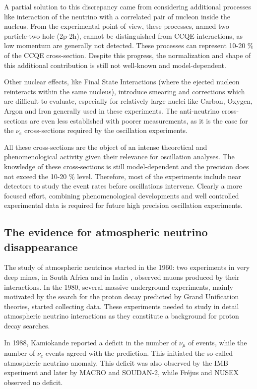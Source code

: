 A partial solution to this discrepancy came from considering additional processes like interaction of the neutrino with a correlated pair of nucleon inside the nucleus. From the experimental point of view, these processes, named two particle-two hole (2p-2h), cannot be distinguished from CCQE interactions, as low momentum are generally not detected. These processes can represent 10-20 \% of the CCQE cross-section. Despite this progress, the normalization and shape of this additional contribution is still not well-known and model-dependent.

Other nuclear effects, like Final State Interactions (where the ejected nucleon reinteracts within the same nucleus), introduce smearing and corrections which are difficult to evaluate, especially for relatively large nuclei like Carbon, Oxygen, Argon and Iron generally used in these experiments. 
The anti-neutrino cross-sections are even less established with poorer measurements, as it is the case for the $\nu_e$ cross-sections required by the oscillation experiments.  


All these cross-sections are the object of an intense theoretical and phenomenological activity \cite{zeller,martini} given their relevance for oscillation analyses. The knowledge of these cross-sections is still model-dependent and the precision does not exceed the 10-20 \% level. Therefore, most of the experiments include near detectors to study the event rates before oscillations intervene. Clearly a more focused effort, combining phenomenological developments and well controlled experimental data is required for future high precision oscillation experiments.


\subsection{The evidence for atmospheric neutrino disappearance}
\label{subsec:atmevidence}

The study of atmospheric neutrinos started in the 1960: two experiments in very deep mines, in South Africa \cite{Reines:1965qk} and in India \cite{Achar:1965ova}, observed muons produced by their interactions. 
In the 1980, several massive underground experiments, mainly motivated by the search for the proton decay predicted by Grand Unification theories, started collecting data. These experiments needed to study in detail atmospheric neutrino interactions as they constitute a background for proton decay searches.

In 1988, Kamiokande reported a deficit in the number of $\nu_\mu$ of events, while the number of $\nu_e$ events agreed with the prediction. This initiated the so-called atmospheric neutrino anomaly. This deficit was also observed by the IMB experiment and later by MACRO and SOUDAN-2, while Fr\'ejus and NUSEX observed no deficit. 

